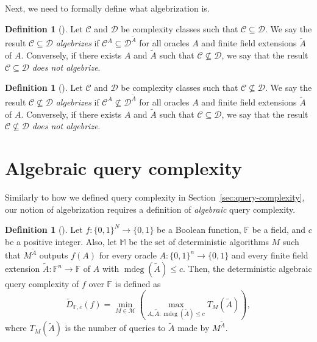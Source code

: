 \documentclass{reedthesis}
\theoremstyle{plain}
\theoremstyle{definition}
\newtheorem{defn}[thm]{Definition}
\theoremstyle{remark}
\DeclareMathOperator{\mdeg}{mdeg}
\numberwithin{equation}{section}
\begin{document}
Next, we need to formally define what algebrization is.

\begin{defn}[{\cite[Def.\ 2.3]{AW09}}]\label{def:algebrization}
  Let $\mathcal{C}$ and $\mathcal{D}$ be complexity classes such that $\mathcal{C} \subseteq \mathcal{D}$. We say the result
  $\mathcal{C} \subseteq \mathcal{D}$ \emph{algebrizes} if $\mathcal{C}^{A} \subseteq \mathcal{D}^{\tilde{A}}$ for all oracles $A$ and
  finite field extensions $\tilde{A}$ of $A$. Conversely, if there exists $A$
  and $\tilde{A}$ such that $\mathcal{C} \nsubseteq \mathcal{D}$, we say that the result $\mathcal{C} \subseteq \mathcal{D}$ \emph{does
    not algebrize}.
\end{defn}

\begin{defn}[{\cite[Def.\ 2.3]{AW09}}]\label{def:algebrization-neq}
  Let $\mathcal{C}$ and $\mathcal{D}$ be complexity classes such that $\mathcal{C} \nsubseteq \mathcal{D}$. We say the result
  $\mathcal{C} \nsubseteq \mathcal{D}$ \emph{algebrizes} if $\mathcal{C}^{A} \nsubseteq \mathcal{D}^{\tilde{A}}$ for all oracles $A$ and
  finite field extensions $\tilde{A}$ of $A$. Conversely, if there exists $A$
  and $\tilde{A}$ such that $\mathcal{C} \subseteq \mathcal{D}$, we say that the result $\mathcal{C} \nsubseteq \mathcal{D}$ \emph{does
    not algebrize}.
\end{defn}

\section{Algebraic query complexity}

Similarly to how we defined query complexity in
Section~\ref{sec:query-complexity}, our notion of algebrization requires a
definition of \emph{algebraic} query complexity. %

\begin{defn}[{\cite[Def. 4.1]{AW09}}]\label{def:aqc}
  Let $f: \{0, 1\}^{N} \rightarrow \{0, 1\}$ be a Boolean function, $\mathbb{F}$ be a
  field, and $c$ be a positive integer. Also, let $\mathbb{M}$ be the set of
  deterministic algorithms $M$ such that $M^{\tilde{A}}$ outputs $f(A)$ for
  every oracle $A: \{0, 1\}^{n} \rightarrow \{0, 1\}$ and every finite field extension
  $\tilde{A}: \mathbb{F}^{n} \rightarrow \mathbb{F}$ of $A$ with $\mdeg(\tilde{A}) \le c$.
  Then, the deterministic algebraic query complexity of $f$ over $\mathbb{F}$ is
  defined as
  \begin{equation}
    \tilde{D}_{\mathbb{F}, c}(f) = \min_{M \in \mathcal{M}}\left(
      \max_{A, \tilde{A}: \mdeg(\tilde{A}) \le c}T_{M}(\tilde{A})
    \right),
  \end{equation}
  where $T_{M}(\tilde{A})$ is the number of queries to $\tilde{A}$ made by
  $M^{\tilde{A}}$.
\end{defn}
\end{document}
